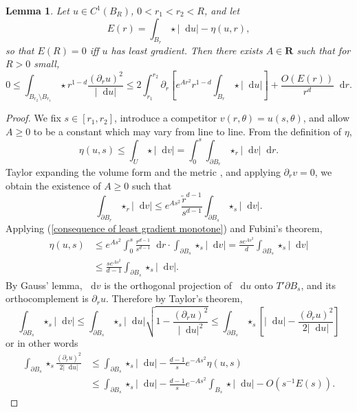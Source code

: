 \documentclass[reqno,12pt,letterpaper]{amsart}
\newcommand{\RR}{\mathbf{R}}
\newcommand*\dif{\mathop{}\!\mathrm{d}}
\newtheorem{lemma}[theorem]{Lemma}
\theoremstyle{definition}
\numberwithin{equation}{section}
\begin{document}
\begin{lemma}\label{monotonicity lemma}
Let $u \in C^1(B_R)$, $0 < r_1 < r_2 < R$, and let
$$E(r) = \int_{B_r} \star |\dif u| - \eta(u, r),$$
so that $E(R) = 0$ iff $u$ has least gradient. Then there exists $A \in \RR$ such that for $R > 0$ small,
\begin{equation}\label{monotonicity lemma eqn}
0 \leq \int_{B_{r_2} \setminus B_{r_1}} \star r^{1 - d}\frac{(\partial_ru)^2}{|\dif u|} \leq 2\int_{r_1}^{r_2} \partial_r \left[e^{Ar^2} r^{1-d}\int_{B_r} \star |\dif u|\right] + \frac{O(E(r))}{r^d} \dif r.
\end{equation}
\end{lemma}
\begin{proof}
We fix $s \in [r_1, r_2]$, introduce a competitor $v(r, \theta) = u(s, \theta)$, and allow $A \geq 0$ to be a constant which may vary from line to line.
From the definition of $\eta$,
\begin{equation}\label{consequence of least gradient monotone}
    \eta(u, s) \leq \int_U \star |\dif v| = \int_0^s \int_{\partial B_r} \star_r |\dif v| \dif r.
\end{equation}
Taylor expanding the volume form and the metric \cite[Lemma 3.4]{schoen1994lectures}, and applying $\partial_r v = 0$, we obtain the existence of $A \geq 0$ such that
$$\int_{\partial B_r} \star_r |\dif v| \leq e^{As^2} \frac{\tilde r^{d - 1}}{s^{d - 1}} \int_{\partial B_s} \star_s |\dif v|.$$
Applying (\ref{consequence of least gradient monotone}) and Fubini's theorem,
\begin{align*}
\eta(u, s) &\leq  e^{As^2} \int_0^s \frac{r^{d - 1}}{s^{d - 1}} \dif r \cdot \int_{\partial B_s} \star_s |\dif v| = \frac{s e^{As^2}}{d} \int_{\partial B_s} \star_s |\dif v|\\
&\leq \frac{s e^{As^2}}{d - 1} \int_{\partial B_s} \star_s |\dif v|.
\end{align*}
By Gauss' lemma, $\dif v$ is the orthogonal projection of $\dif u$ onto $T' \partial B_s$, and its orthocomplement is $\partial_r u$. Therefore by Taylor's theorem,
$$\int_{\partial B_s} \star_s |\dif v| \leq \int_{\partial B_s} \star_s |\dif u| \sqrt{1 - \frac{(\partial_r u)^2}{|\dif u|^2}} \leq \int_{\partial B_s} \star_s \left[|\dif u| - \frac{(\partial_r u)^2}{2 |\dif u|}\right]$$
or in other words
\begin{align*}
\int_{\partial B_s} \star_s \frac{(\partial_r u)^2}{2|\dif u|} &\leq \int_{\partial B_s} \star_s |\dif u| - \frac{d - 1}{s} e^{-As^2} \eta(u, s)\\
&\leq \int_{\partial B_s} \star_s |\dif u| - \frac{d - 1}{s} e^{-As^2} \int_{B_s} \star |\dif u| - O(s^{-1}E(s)).

\end{align*}
\end{proof}
\end{document}
